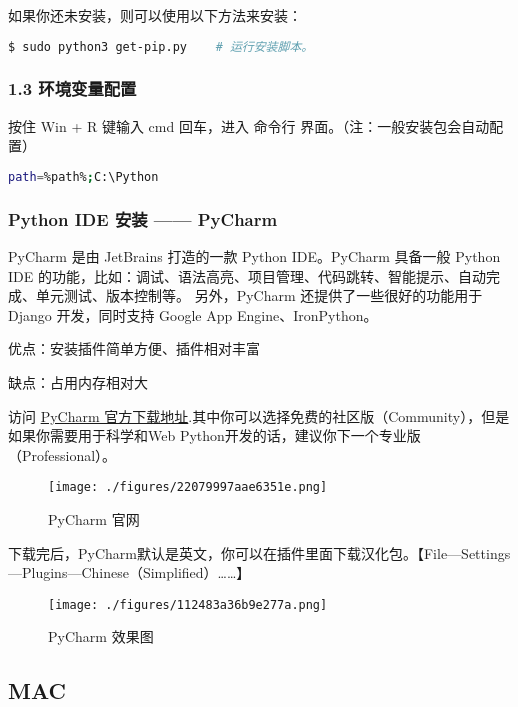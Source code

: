 如果你还未安装，则可以使用以下方法来安装：

\begin{lstlisting}[language=bash]
$ sudo python3 get-pip.py    # 运行安装脚本。
\end{lstlisting}

\subsubsection{1.3 环境变量配置}

按住 Win + R 键输入 cmd 回车，进入 命令行 界面。（注：一般安装包会自动配置）

\begin{lstlisting}[language=bash]
path=%path%;C:\Python 
\end{lstlisting}

\subsubsection{Python IDE 安装 —— PyCharm}

PyCharm 是由 JetBrains 打造的一款 Python IDE。PyCharm 具备一般 Python IDE 的功能，比如：调试、语法高亮、项目管理、代码跳转、智能提示、自动完成、单元测试、版本控制等。 另外，PyCharm 还提供了一些很好的功能用于 Django 开发，同时支持 Google App Engine、IronPython。

优点：安装插件简单方便、插件相对丰富

缺点：占用内存相对大

访问 \href{http://www.jetbrains.com/pycharm/download/}{PyCharm 官方下载地址}.其中你可以选择免费的社区版（Community），但是如果你需要用于科学和Web Python开发的话，建议你下一个专业版（Professional）。

\begin{figure}[ht]
\centering
\texttt{[image: ./figures/22079997aae6351e.png]}
\caption{PyCharm 官网} \label{fig_PyIDE_1}
\end{figure}

下载完后，PyCharm默认是英文，你可以在插件里面下载汉化包。【File—Settings—Plugins—Chinese（Simplified）……】

\begin{figure}[ht]
\centering
\texttt{[image: ./figures/112483a36b9e277a.png]}
\caption{PyCharm 效果图} \label{fig_PyIDE_2}
\end{figure}

\subsection{MAC}\label{sub_Pyc1_2}

